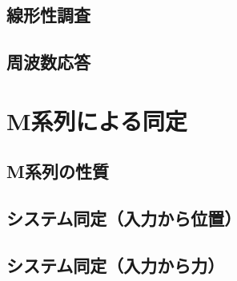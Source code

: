 \subsection{線形性調査}
\subsection{周波数応答}
\section{M系列による同定}
\subsection{M系列の性質}
\subsection{システム同定（入力から位置）}
\subsection{システム同定（入力から力）}

